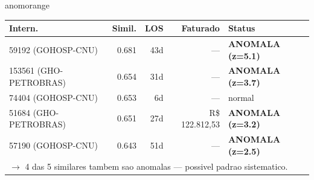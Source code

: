 \documentclass[a4paper,10pt]{article}
\begin{document}
\begin{anomalycard}[Internacao 7232 | GHO-ABERTTA | ALTO (z=3.77)]{anomorange}
\begin{tabular}{l r r r l}\toprule\textbf{Intern.} & \textbf{Simil.} & \textbf{LOS} & \textbf{Faturado} & \textbf{Status} \\\midrule
59192 (GOHOSP-CNU) & 0.681 & 43d & --- & \textcolor{anomred}{\textbf{ANOMALA (z=5.1)}} \\
153561 (GHO-PETROBRAS) & 0.654 & 31d & --- & \textcolor{anomred}{\textbf{ANOMALA (z=3.7)}} \\
74404 (GOHOSP-CNU) & 0.653 & 6d & --- & \textcolor{jcubeblue}{normal} \\
51684 (GHO-PETROBRAS) & 0.651 & 27d & R\$ 122.812,53 & \textcolor{anomred}{\textbf{ANOMALA (z=3.2)}} \\
57190 (GOHOSP-CNU) & 0.643 & 51d & --- & \textcolor{anomred}{\textbf{ANOMALA (z=2.5)}} \\
\multicolumn{5}{l}{\textcolor{anomred}{\small $\rightarrow$ 4 das 5 similares tambem sao anomalas --- possivel padrao sistematico.}} \\
\bottomrule\end{tabular}


\end{anomalycard}

\newpage
\end{document}
